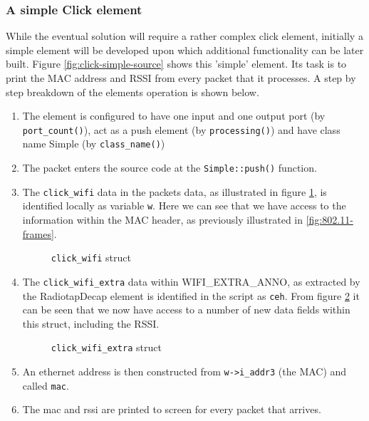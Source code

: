         \subsubsection{A simple Click element}

            While the eventual solution will require a rather complex click element, initially a simple element will be developed upon which additional functionality can be later built. Figure \ref{fig:click-simple-source} shows this 'simple' element. Its task is to print the MAC address and RSSI from every packet that it processes. A step by step breakdown of the elements operation is shown below.

            \begin{enumerate}
            \item The element is configured to have one input and one output port (by \texttt{port\_count()}), act as a push element (by \texttt{processing()}) and have class name Simple (by \texttt{class\_name()})
            \item The packet enters the source code at the \texttt{Simple::push()} function.
            \item The \texttt{click\_wifi} data in the packets data, as illustrated in figure \ref{fig:click_wifi}, is identified locally as variable \texttt{w}. Here we can see that we have access to the information within the MAC header, as previously illustrated in \ref{fig:802.11-frames}.\begin{figure}[H]
              \centering
              
              \caption{\texttt{click\_wifi} struct}
              \label{fig:click_wifi}
            \end{figure}
            \item The \texttt{click\_wifi\_extra} data within WIFI\_EXTRA\_ANNO, as extracted by the RadiotapDecap element is identified in the script as \texttt{ceh}. From figure \ref{fig:click_wifi_extra} it can be seen that we now have access to a number of new data fields within this struct, including the RSSI.
            \begin{figure}[H]
              \centering
              
              \caption{\texttt{click\_wifi\_extra} struct}
              \label{fig:click_wifi_extra}
            \end{figure}
            \item An ethernet address is then constructed from \texttt{w->i\_addr3} (the MAC) and called \texttt{mac}.
            \item The mac and rssi are printed to screen for every packet that arrives.
            \end{enumerate}

